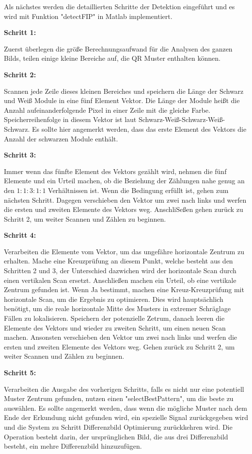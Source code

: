 Als nächstes werden die detaillierten Schritte der Detektion eingeführt und es wird mit Funktion "detectFIP" in Matlab implementiert.

\textbf{Schritt 1:}

Zuerst überlegen die größe Berechnungsaufwand für die Analysen des ganzen  Bilds, teilen einige kleine Bereiche auf, die QR Muster enthalten können.

\textbf{Schritt 2:}

Scannen jede Zeile dieses kleinen Bereiches und speichern die Länge der Schwarz und Weiß Module in eine fünf Element Vektor. Die Länge der Module heißt die Anzahl aufeinanderfolgende Pixel in einer Zeile mit die gleiche Farbe. Speicherreihenfolge in diesem Vektor ist laut Schwarz-Weiß-Schwarz-Weiß-Schwarz. Es sollte hier angemerkt werden, dass das erste Element des Vektors die Anzahl der schwarzen Module enthält. 

\textbf{Schritt 3:}

Immer wenn das fünfte Element des Vektors gezählt wird, nehmen die fünf Elemente und ein Urteil machen, ob die Beziehung der Zählungen nahe genug an den $1:1:3:1:1$ Verhältnissen ist. Wenn die Bedingung erfüllt ist, gehen zum nächsten Schritt. Dagegen verschieben den Vektor um zwei nach links und werfen die ersten und zweiten Elemente des Vektors weg. AnschliSeßen gehen zurück zu Schritt 2, um weiter Scannen und Zählen zu beginnen.                

\textbf{Schritt 4:}

Verarbeiten die Elemente vom Vektor, um das ungefähre horizontale Zentrum zu erhalten. Mache eine Kreuzprüfung an diesem Punkt, welche besteht aus den Schritten 2 und 3, der Unterschied dazwichen wird der horizontale Scan durch einen vertikalen Scan ersetzt. Anschließen machen ein Urteil, ob eine vertikale Zentrum gefunden ist. Wenn Ja bestimmt, machen eine Kreuz-Kreuzprüfung mit horizontale Scan, um die Ergebnis zu optimieren. Dies wird hauptsächlich benötigt, um die reale horizontale Mitte des Musters in  extremer Schräglage Fällen zu lokalisieren. Speichern der potenzielle Zetrum, danach leeren die Elemente des Vektors und wieder zu zweiten Schritt, um einen neuen Scan machen. Ansonsten verschieben den Vektor um zwei nach links und werfen die ersten und zweiten Elemente des Vektors weg. Gehen zurück zu Schritt 2, um weiter Scannen und Zählen zu beginnen.                

\textbf{Schritt 5:}

Verarbeiten die Ausgabe des vorherigen Schritts, falls es nicht nur eine potentiell Muster Zentrum gefunden, nutzen einen "selectBestPattern", um die beste zu auswählen. Es sollte angemerkt werden, dass wenn die mögliche Muster nach dem Ende der Erkundung nicht gefunden wird, ein spezielle Signal zurückgegeben wird und die System zu Schritt Differenzbild Optimierung zurückkehren wird. Die Operation besteht darin, der ursprünglichen Bild, die aus drei Differenzbild besteht, ein mehre Differenzbild hinzuzufügen.
                       
